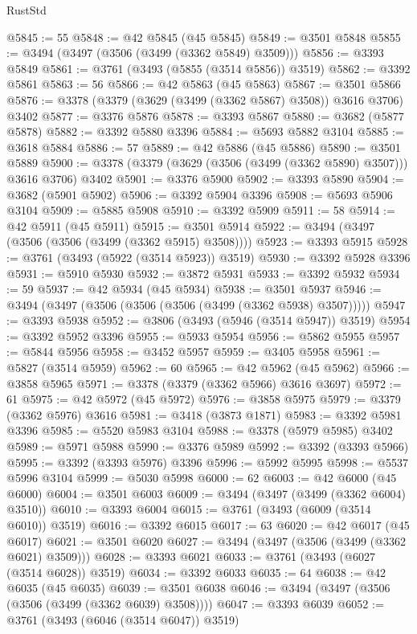 \begin{lexlean}{RustStd}
\begin{coremodule}
@5845 := 55
@5848 := @42 @5845 (@45 @5845)
@5849 := @3501 @5848
@5855 := @3494 (@3497 (@3506 (@3499 (@3362 @5849) @3509)))
@5856 := @3393 @5849
@5861 := @3761 (@3493 (@5855 (@3514 @5856)) @3519)
@5862 := @3392 @5861
@5863 := 56
@5866 := @42 @5863 (@45 @5863)
@5867 := @3501 @5866
@5876 := @3378 (@3379 (@3629 (@3499 (@3362 @5867) @3508)) @3616 @3706) @3402
@5877 := @3376 @5876
@5878 := @3393 @5867
@5880 := @3682 (@5877 @5878)
@5882 := @3392 @5880 @3396
@5884 := @5693 @5882 @3104
@5885 := @3618 @5884
@5886 := 57
@5889 := @42 @5886 (@45 @5886)
@5890 := @3501 @5889
@5900 := @3378 (@3379 (@3629 (@3506 (@3499 (@3362 @5890) @3507))) @3616 @3706) @3402
@5901 := @3376 @5900
@5902 := @3393 @5890
@5904 := @3682 (@5901 @5902)
@5906 := @3392 @5904 @3396
@5908 := @5693 @5906 @3104
@5909 := @5885 @5908
@5910 := @3392 @5909
@5911 := 58
@5914 := @42 @5911 (@45 @5911)
@5915 := @3501 @5914
@5922 := @3494 (@3497 (@3506 (@3506 (@3499 (@3362 @5915) @3508))))
@5923 := @3393 @5915
@5928 := @3761 (@3493 (@5922 (@3514 @5923)) @3519)
@5930 := @3392 @5928 @3396
@5931 := @5910 @5930
@5932 := @3872 @5931
@5933 := @3392 @5932
@5934 := 59
@5937 := @42 @5934 (@45 @5934)
@5938 := @3501 @5937
@5946 := @3494 (@3497 (@3506 (@3506 (@3506 (@3499 (@3362 @5938) @3507)))))
@5947 := @3393 @5938
@5952 := @3806 (@3493 (@5946 (@3514 @5947)) @3519)
@5954 := @3392 @5952 @3396
@5955 := @5933 @5954
@5956 := @5862 @5955
@5957 := @5844 @5956
@5958 := @3452 @5957
@5959 := @3405 @5958
@5961 := @5827 (@3514 @5959)
@5962 := 60
@5965 := @42 @5962 (@45 @5962)
@5966 := @3858 @5965
@5971 := @3378 (@3379 (@3362 @5966) @3616 @3697)
@5972 := 61
@5975 := @42 @5972 (@45 @5972)
@5976 := @3858 @5975
@5979 := @3379 (@3362 @5976) @3616
@5981 := @3418 (@3873 @1871)
@5983 := @3392 @5981 @3396
@5985 := @5520 @5983 @3104
@5988 := @3378 (@5979 @5985) @3402
@5989 := @5971 @5988
@5990 := @3376 @5989
@5992 := @3392 (@3393 @5966)
@5995 := @3392 (@3393 @5976) @3396
@5996 := @5992 @5995
@5998 := @5537 @5996 @3104
@5999 := @5030 @5998
@6000 := 62
@6003 := @42 @6000 (@45 @6000)
@6004 := @3501 @6003
@6009 := @3494 (@3497 (@3499 (@3362 @6004) @3510))
@6010 := @3393 @6004
@6015 := @3761 (@3493 (@6009 (@3514 @6010)) @3519)
@6016 := @3392 @6015
@6017 := 63
@6020 := @42 @6017 (@45 @6017)
@6021 := @3501 @6020
@6027 := @3494 (@3497 (@3506 (@3499 (@3362 @6021) @3509)))
@6028 := @3393 @6021
@6033 := @3761 (@3493 (@6027 (@3514 @6028)) @3519)
@6034 := @3392 @6033
@6035 := 64
@6038 := @42 @6035 (@45 @6035)
@6039 := @3501 @6038
@6046 := @3494 (@3497 (@3506 (@3506 (@3499 (@3362 @6039) @3508))))
@6047 := @3393 @6039
@6052 := @3761 (@3493 (@6046 (@3514 @6047)) @3519)

\end{coremodule}
\end{lexlean}

